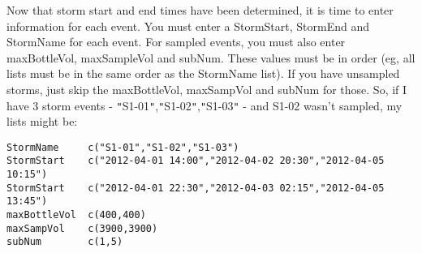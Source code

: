 \documentclass[a4paper,11pt]{article}\usepackage[]{graphicx}\usepackage[]{color}
\begin{document}
Now that storm start and end times have been determined, it is time to enter information for each event. You must enter a StormStart, StormEnd and StormName for each event. For sampled events, you must also enter maxBottleVol, maxSampleVol and subNum. These values must be in order (eg, all lists must be in the same order as the StormName list). If you have unsampled storms, just skip the maxBottleVol, maxSampVol and subNum for those. So, if I have 3 storm events - \texttt{"}S1-01\texttt{"},\texttt{"}S1-02\texttt{"},\texttt{"}S1-03\texttt{"} - and S1-02 wasn't sampled, my lists might be:
\begin{verbatim}
StormName     c("S1-01","S1-02","S1-03")
StormStart    c("2012-04-01 14:00","2012-04-02 20:30","2012-04-05 10:15")
StormStart    c("2012-04-01 22:30","2012-04-03 02:15","2012-04-05 13:45")
maxBottleVol  c(400,400)
maxSampVol    c(3900,3900)
subNum        c(1,5)
\end{verbatim}
\end{document}
